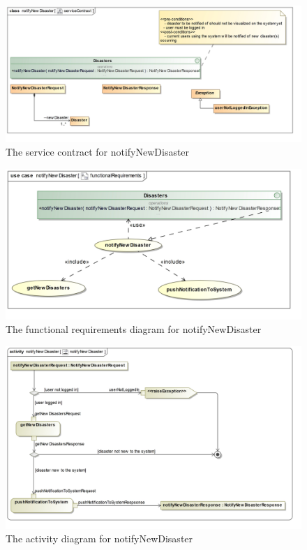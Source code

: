  \begin{figure}[H]
	\includegraphics[scale=0.2]{../images/funcReq/notifyNewDisasterServiceContract.jpg}
	\caption{The service contract for notifyNewDisaster \label{overflow}}
\end{figure}

\begin{figure}[H]
	\centering
	\includegraphics[width=1.2\textwidth]{../images/funcReq/notifyNewDisasterFunctionalRequirements.jpg}
	\caption{The functional requirements diagram for notifyNewDisaster \label{overflow}}
\end{figure}

\begin{figure}[H]
	\centering
	\includegraphics[scale=0.21]{../images/funcReq/notifyNewDisasterActivityDiagram.jpg}
	\caption{The activity diagram for notifyNewDisaster \label{overflow}}
\end{figure} 

